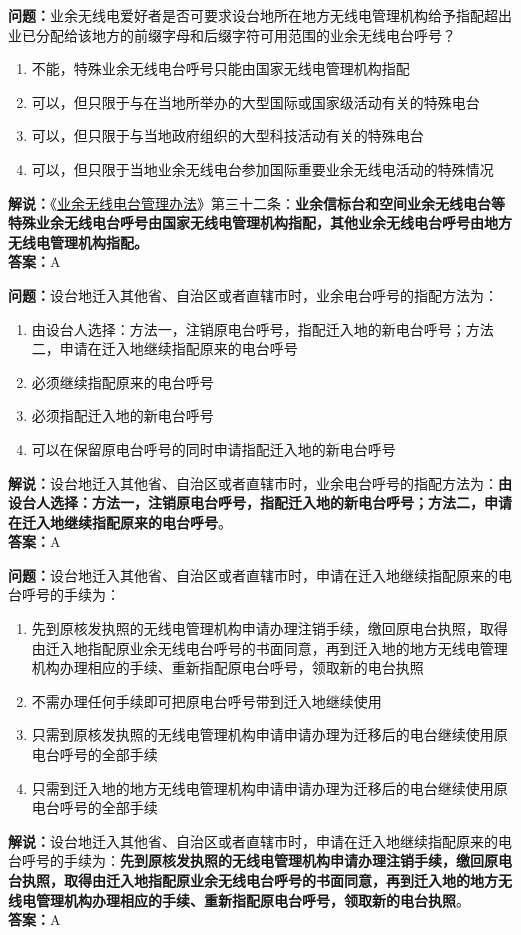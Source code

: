 \textbf{问题：}业余无线电爱好者是否可要求设台地所在地方无线电管理机构给予指配超出业已分配给该地方的前缀字母和后缀字符可用范围的业余无线电台呼号？
\begin{enumerate}[label=\Alph*), leftmargin=1.5cm]
	\item 不能，特殊业余无线电台呼号只能由国家无线电管理机构指配
	\item 可以，但只限于与在当地所举办的大型国际或国家级活动有关的特殊电台
	\item 可以，但只限于与当地政府组织的大型科技活动有关的特殊电台
	\item 可以，但只限于当地业余无线电台参加国际重要业余无线电活动的特殊情况
\end{enumerate}
\textbf{解说：}《\href{https://www.miit.gov.cn/jgsj/zfs/bmgz/art/2020/art_147b69815b3641caad9047735f94c860.html}{业余无线电台管理办法}》第三十二条：\textbf{业余信标台和空间业余无线电台等特殊业余无线电台呼号由国家无线电管理机构指配，其他业余无线电台呼号由地方无线电管理机构指配。}\\\textbf{答案：}A

\textbf{问题：}设台地迁入其他省、自治区或者直辖市时，业余电台呼号的指配方法为：
\begin{enumerate}[label=\Alph*), leftmargin=1.5cm]
	\item 由设台人选择：方法一，注销原电台呼号，指配迁入地的新电台呼号；方法二，申请在迁入地继续指配原来的电台呼号
	\item 必须继续指配原来的电台呼号
	\item 必须指配迁入地的新电台呼号
	\item 可以在保留原电台呼号的同时申请指配迁入地的新电台呼号
\end{enumerate}
\textbf{解说：}设台地迁入其他省、自治区或者直辖市时，业余电台呼号的指配方法为：\textbf{由设台人选择：方法一，注销原电台呼号，指配迁入地的新电台呼号；方法二，申请在迁入地继续指配原来的电台呼号}。\\\textbf{答案：}A%

\textbf{问题：}设台地迁入其他省、自治区或者直辖市时，申请在迁入地继续指配原来的电台呼号的手续为：
\begin{enumerate}[label=\Alph*), leftmargin=1.5cm]
	\item 先到原核发执照的无线电管理机构申请办理注销手续，缴回原电台执照，取得由迁入地指配原业余无线电台呼号的书面同意，再到迁入地的地方无线电管理机构办理相应的手续、重新指配原电台呼号，领取新的电台执照
	\item 不需办理任何手续即可把原电台呼号带到迁入地继续使用
	\item 只需到原核发执照的无线电管理机构申请申请办理为迁移后的电台继续使用原电台呼号的全部手续
	\item 只需到迁入地的地方无线电管理机构申请申请办理为迁移后的电台继续使用原电台呼号的全部手续
\end{enumerate}
\textbf{解说：}设台地迁入其他省、自治区或者直辖市时，申请在迁入地继续指配原来的电台呼号的手续为：\textbf{先到原核发执照的无线电管理机构申请办理注销手续，缴回原电台执照，取得由迁入地指配原业余无线电台呼号的书面同意，再到迁入地的地方无线电管理机构办理相应的手续、重新指配原电台呼号，领取新的电台执照}。\\\textbf{答案：}A%

